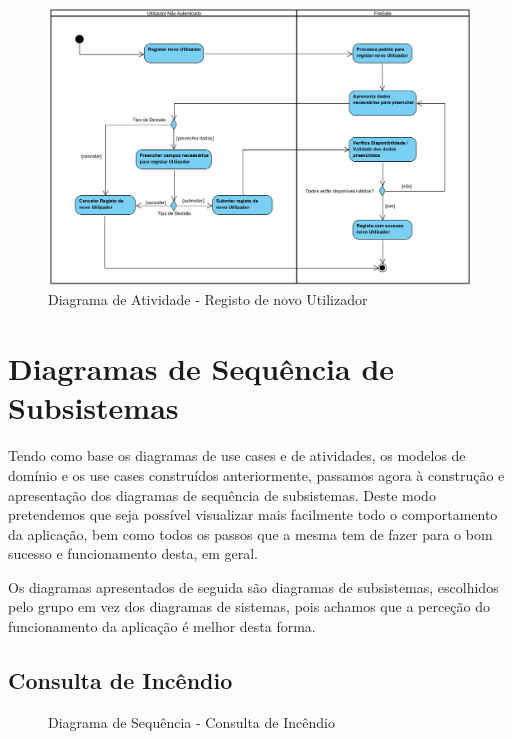 \documentclass[a4paper,12pt]{scrreprt}
\newcommand{\tab}{
    \hspace{1cm}}
\begin{document}
\begin{figure}[H]
    \centering
    \includegraphics[width=.9\textwidth]{images/Fase2/06.DiagramasDeAtividade/3.atividadeRegistaUtilizador.png}
    \caption{Diagrama de Atividade - Registo de novo Utilizador}
\end{figure}


\chapter{Diagramas de Sequência de Subsistemas}

\tab Tendo como base os diagramas de use cases e de atividades, os modelos de domínio e os use cases construídos anteriormente, passamos agora à construção e apresentação dos diagramas de sequência de subsistemas. Deste modo pretendemos que seja possível visualizar mais facilmente todo o comportamento da aplicação, bem como todos os passos que a mesma tem de fazer para o bom sucesso e funcionamento desta, em geral.

\tab Os diagramas apresentados de seguida são diagramas de subsistemas, escolhidos pelo grupo em vez dos diagramas de sistemas, pois achamos que a perceção do funcionamento da aplicação é melhor desta forma.

\section{Consulta de Incêndio}

\begin{figure}[hbt!]
    \centering
    \caption{Diagrama de Sequência - Consulta de Incêndio}
\end{figure}
\end{document}
